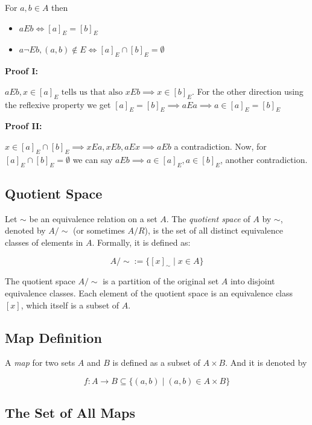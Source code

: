 For \(a,b \in A\) then 

\begin{itemize}

	\item \(aEb \iff [a]_E = [b]_E\)

	\item \(a \neg E b, (a,b) \notin E \iff [a]_E \cap [b]_E = \emptyset \)

\end{itemize}

\textbf{Proof I:}

\(aEb, x \in [a]_E \text{ tells us that also } x E b \implies x \in [b]_E \). For the other direction 
using the reflexive property we get \([a]_E = [b]_E \implies a E a \implies a \in [a]_E = [b]_E\)

\QED

\textbf{Proof II:}

\(x \in [a]_E \cap [b]_E \implies x E a, x E b, a E x \implies a E b\) a contradiction. 
Now, for \( [a]_E \cap [b]_E = \emptyset\) we can say \(a E b \implies a \in [a]_E, a \in [b]_E \), another contradiction.

\QED 

\subsection{Quotient Space}

Let \(\sim\) be an equivalence relation on a set \(A\). The \emph{quotient space} of \(A\) by 
\(\sim\), denoted by \(A / \sim\) (or sometimes \(A / R\)), is the set of all distinct equivalence classes of 
elements in \(A\). Formally, it is defined as:

\[
	A / \sim := \{[x]_\sim \mid x \in A\}
\]

The quotient space \(A/\sim\) is a partition of the original set \(A\) into disjoint equivalence classes. 
Each element of the quotient space is an equivalence class \([x]\), which itself is a subset of \(A\).

\subsection{Map Definition}

A \emph{map} for two sets \(A\) and \(B\) is defined as a subset of \(A \times B\). And it is denoted by 

\[
	f: A \to B \subseteq \{(a, b) \mid (a,b) \in A \times B\}
\]

\subsection{The Set of All Maps}


